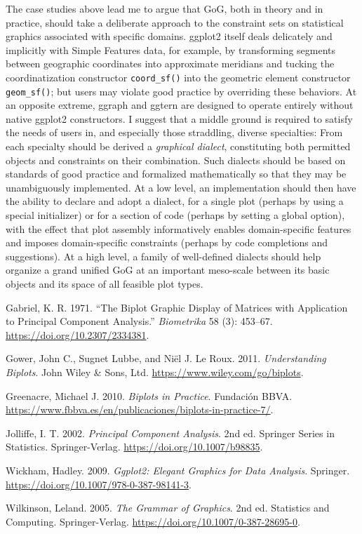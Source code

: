 \documentclass[
]{article}
\newlength{\cslhangindent}
\newenvironment{CSLReferences}[2] %
 {\begin{list}{}{%
  \setlength{\itemindent}{0pt}
  \setlength{\leftmargin}{0pt}
  \setlength{\parsep}{0pt}
  \ifodd #1
   \setlength{\leftmargin}{\cslhangindent}
   \setlength{\itemindent}{-1\cslhangindent}
  \fi
  \setlength{\itemsep}{#2\baselineskip}}}
 {\end{list}}
\begin{document}
The case studies above lead me to argue that GoG, both in theory and in
practice, should take a deliberate approach to the constraint sets on
statistical graphics associated with specific domains. \textsf{ggplot2}
itself deals delicately and implicitly with Simple Features data, for
example, by transforming segments between geographic coordinates into
approximate meridians and tucking the coordinatization constructor
\texttt{coord\_sf()} into the geometric element constructor
\texttt{geom\_sf()}; but users may violate good practice by overriding
these behaviors. At an opposite extreme, \textsf{ggraph} and
\textsf{ggtern} are designed to operate entirely without native
\textsf{ggplot2} constructors. I suggest that a middle ground is
required to satisfy the needs of users in, and especially those
straddling, diverse specialties: From each specialty should be derived a
\emph{graphical dialect}, constituting both permitted objects and
constraints on their combination. Such dialects should be based on
standards of good practice and formalized mathematically so that they
may be unambiguously implemented. At a low level, an implementation
should then have the ability to declare and adopt a dialect, for a
single plot (perhaps by using a special initializer) or for a section of
code (perhaps by setting a global option), with the effect that plot
assembly informatively enables domain-specific features and imposes
domain-specific constraints (perhaps by code completions and
suggestions). At a high level, a family of well-defined dialects should
help organize a grand unified GoG at an important meso-scale between its
basic objects and its space of all feasible plot types.

\protect{}\label{refs}
\begin{CSLReferences}{1}{1}
Gabriel, K. R. 1971. {``The Biplot Graphic Display of Matrices with
Application to Principal Component Analysis.''} \emph{Biometrika} 58
(3): 453--67. \url{https://doi.org/10.2307/2334381}.

Gower, John C., Sugnet Lubbe, and Niël J. Le Roux. 2011.
\emph{Understanding Biplots}. John Wiley \& Sons, Ltd.
\url{https://www.wiley.com/go/biplots}.

Greenacre, Michael J. 2010. \emph{Biplots in Practice}. Fundación BBVA.
\url{https://www.fbbva.es/en/publicaciones/biplots-in-practice-7/}.

Jolliffe, I. T. 2002. \emph{Principal Component Analysis}. 2nd ed.
Springer Series in Statistics. Springer-Verlag.
\url{https://doi.org/10.1007/b98835}.

Wickham, Hadley. 2009. \emph{Ggplot2: Elegant Graphics for Data
Analysis}. Springer. \url{https://doi.org/10.1007/978-0-387-98141-3}.

Wilkinson, Leland. 2005. \emph{The Grammar of Graphics}. 2nd ed.
Statistics and Computing. Springer-Verlag.
\url{https://doi.org/10.1007/0-387-28695-0}.

\end{CSLReferences}
\end{document}
